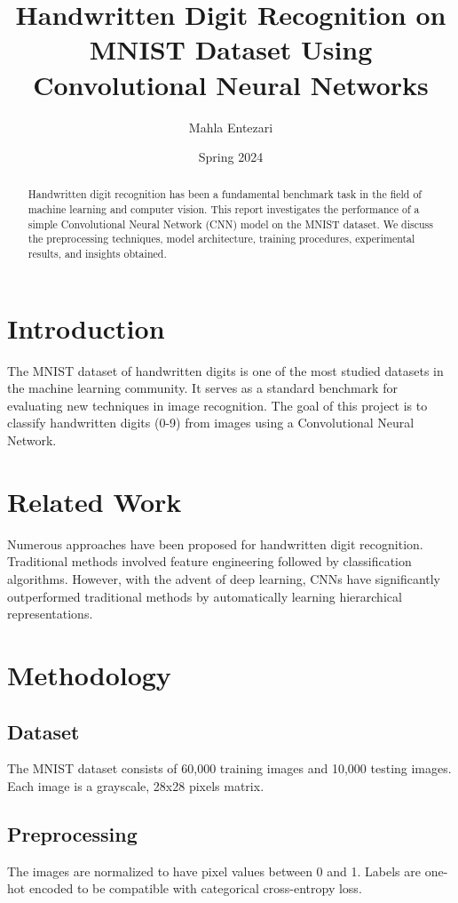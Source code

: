 \documentclass[12pt]{article}
\title{Handwritten Digit Recognition on MNIST Dataset Using Convolutional Neural Networks}
\author{Mahla Entezari}
\date{Spring 2024}
\begin{document}
\maketitle

\begin{abstract}
Handwritten digit recognition has been a fundamental benchmark task in the field of machine learning and computer vision. This report investigates the performance of a simple Convolutional Neural Network (CNN) model on the MNIST dataset. We discuss the preprocessing techniques, model architecture, training procedures, experimental results, and insights obtained.
\end{abstract}

\section{Introduction}
The MNIST dataset of handwritten digits is one of the most studied datasets in the machine learning community. It serves as a standard benchmark for evaluating new techniques in image recognition. The goal of this project is to classify handwritten digits (0-9) from images using a Convolutional Neural Network.

\section{Related Work}
Numerous approaches have been proposed for handwritten digit recognition. Traditional methods involved feature engineering followed by classification algorithms. However, with the advent of deep learning, CNNs have significantly outperformed traditional methods by automatically learning hierarchical representations.

\section{Methodology}

\subsection{Dataset}
The MNIST dataset consists of 60,000 training images and 10,000 testing images. Each image is a grayscale, 28x28 pixels matrix.

\subsection{Preprocessing}
The images are normalized to have pixel values between 0 and 1. Labels are one-hot encoded to be compatible with categorical cross-entropy loss.
\end{document}
